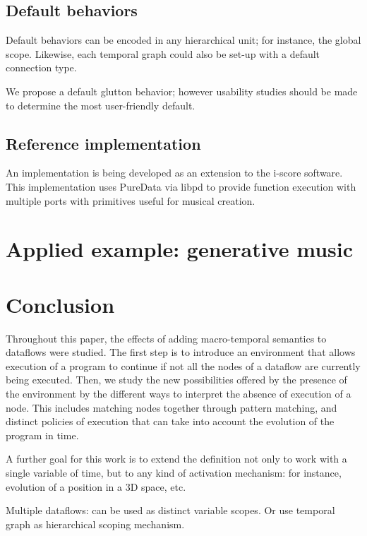 \documentclass{article}
\begin{document}
\subsection{Default behaviors}
Default behaviors can be encoded in any hierarchical unit; for instance, the global scope. 
Likewise, each temporal graph could also be set-up with a default connection type.

We propose a default glutton behavior; however usability studies should be made to determine the most user-friendly default.

\subsection{Reference implementation}
An implementation is being developed as an extension to the i-score software. 
This implementation uses PureData via libpd to provide function execution with multiple ports
with primitives useful for musical creation.

\section{Applied example: generative music}

\section{Conclusion}
Throughout this paper, the effects of adding macro-temporal semantics to dataflows were studied. 
The first step is to introduce an environment that allows execution of a program to continue if not all the nodes of a dataflow are currently being executed.
Then, we study the new possibilities offered by the presence of the environment by the different ways to interpret the absence of execution of a node.
This includes matching nodes together through pattern matching, and distinct policies of execution that can take into account the evolution of the program in time.


A further goal for this work is to extend the definition not only to work with a single variable of time, but to any kind of activation mechanism: for instance, evolution of a position in a 3D space, etc.

Multiple dataflows: can be used as distinct variable scopes. Or use temporal graph as hierarchical scoping mechanism. 
    
\printbibliography 
\end{document}
